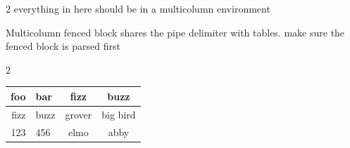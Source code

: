 
\bigskip

\begin{multicols}{2}
    everything in here should be in a multicolumn environment
\end{multicols}

\bigskip

Multicolumn fenced block shares the pipe delimiter with tables. make sure the fenced block is parsed first

\bigskip

\begin{multicols}{2}

    \begin{tabular}{r l c c}
    foo & bar & fizz & buzz \\
    \hline
    fizz & buzz & grover & big bird \\
    123 & 456 & elmo & abby \\
  \end{tabular}

\end{multicols}

\bigskip